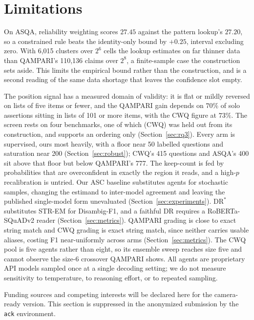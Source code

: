 \documentclass[11pt]{article}
\begin{document}
\section*{Limitations}
\label{sec:limitations}

On ASQA, reliability weighting scores $27.45$ against the pattern lookup's $27.20$, so a constrained rule beats the identity-only bound by $+0.25$, interval excluding zero. With 6,015 clusters over $2^6$ cells the lookup estimates on far thinner data than QAMPARI's 110,136 claims over $2^8$, a finite-sample case the construction sets aside. This limits the empirical bound rather than the construction, and is a second reading of the same data shortage that leaves the confidence slot empty. %

The position signal has a measured domain of validity: it is flat or mildly reversed on lists of five items or fewer, and the QAMPARI gain depends on $70\%$ of solo assertions sitting in lists of 101 or more items, with the CWQ figure at $73\%$. The screen rests on four benchmarks, one of which (CWQ) was held out from its construction, and supports an ordering only (Section~\ref{sec:rq3}). Every arm is supervised, ours most heavily, with a floor near 50 labelled questions and saturation near 200 (Section~\ref{sec:robust}); CWQ's 415 questions and ASQA's 400 sit above that floor but below QAMPARI's 777. The keep-count is fed by probabilities that are overconfident in exactly the region it reads, and a high-$p$ recalibration is untried. Our ASC baseline substitutes agents for stochastic samples, changing the estimand to inter-model agreement and leaving the published single-model form unevaluated (Section~\ref{sec:experiments}). $\mathrm{DR}^*$ substitutes STR-EM for Disambig-F1, and a faithful DR requires a RoBERTa-SQuADv2 reader (Section~\ref{sec:metrics}). QAMPARI grading is close to exact string match and CWQ grading is exact string match, since neither carries usable aliases, costing F1 near-uniformly across arms (Section~\ref{sec:metrics}). The CWQ pool is five agents rather than eight, so its ensemble sweep reaches size five and cannot observe the size-6 crossover QAMPARI shows. All agents are proprietary API models sampled once at a single decoding setting; we do not measure sensitivity to temperature, to reasoning effort, or to repeated sampling.

\begin{ack}
Funding sources and competing interests will be declared here for the camera-ready
version. This section is suppressed in the anonymized submission by the
\texttt{ack} environment.
\end{ack}
\end{document}
